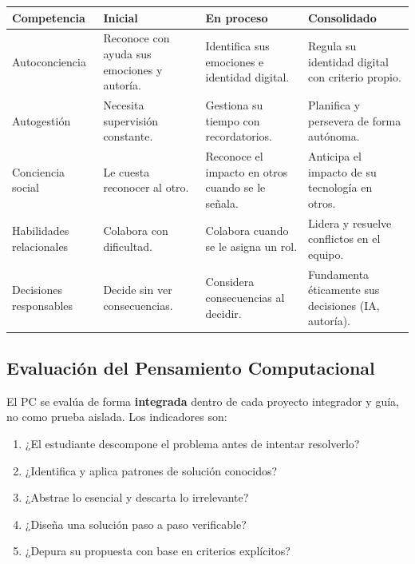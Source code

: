 \documentclass[12pt, a4paper]{article}
\begin{document}
\begin{center}
\scriptsize
\setlength{\tabcolsep}{3pt}
\begin{tabular}{|L{3.1cm}|L{3.5cm}|L{3.5cm}|L{3.4cm}|}
\hline
{}
\color{white}\textbf{Competencia} &
\color{white}\textbf{Inicial} &
\color{white}\textbf{En proceso} &
\color{white}\textbf{Consolidado} \\
\hline
Autoconciencia & Reconoce con ayuda sus emociones y autoría. & Identifica sus emociones e identidad digital. & Regula su identidad digital con criterio propio. \\
\hline
Autogestión & Necesita supervisión constante. & Gestiona su tiempo con recordatorios. & Planifica y persevera de forma autónoma. \\
\hline
Conciencia social & Le cuesta reconocer al otro. & Reconoce el impacto en otros cuando se le señala. & Anticipa el impacto de su tecnología en otros. \\
\hline
Habilidades relacionales & Colabora con dificultad. & Colabora cuando se le asigna un rol. & Lidera y resuelve conflictos en el equipo. \\
\hline
Decisiones responsables & Decide sin ver consecuencias. & Considera consecuencias al decidir. & Fundamenta éticamente sus decisiones (IA, autoría). \\
\hline
\end{tabular}
\end{center}

\subsection{Evaluación del Pensamiento Computacional}

El PC se evalúa de forma \textbf{integrada} dentro de cada proyecto integrador
y guía, no como prueba aislada. Los indicadores son:

\begin{enumerate}
  \item ¿El estudiante descompone el problema antes de intentar resolverlo?
  \item ¿Identifica y aplica patrones de solución conocidos?
  \item ¿Abstrae lo esencial y descarta lo irrelevante?
  \item ¿Diseña una solución paso a paso verificable?
  \item ¿Depura su propuesta con base en criterios explícitos?
\end{enumerate}
\end{document}
